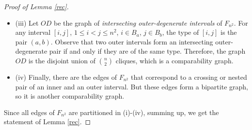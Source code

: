 \documentclass[10pt,a4paper]{amsart}
\begin{document}
\begin{proof}[Proof of Lemma \ref{rec}]
\begin{itemize}
 \item (iii) Let $OD$ be the graph of {\em intersecting outer-degenerate intervals} of $F_{n^2}$.
   For any interval $[i, j]$, $1\le i<j\le n^2$, $i\in B_a$, $j\in B_b$, the type of $[i,j]$ is the pair $(a,b)$.
   Observe that two outer intervals form an intersecting outer-degenerate pair if and only if they are of the same type.
Therefore, the graph $OD$ is the disjoint union of ${n\choose 2}$ cliques, which is a comparability graph.





\item (iv) Finally, there are the edges of $F_{n^2}$ that correspond to a crossing or nested pair of an inner and an outer interval.
But these edges form a bipartite graph, so it is another comparability graph.

\end{itemize}

Since all edges of $F_{n^2}$ are partitioned in (i)-(iv), summing up, we get the statement of Lemma \ref{rec}.
\end{proof}
\end{document}
